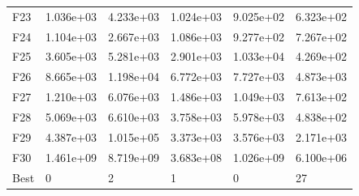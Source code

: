 \begin{tabular}{llllll}
F23  &  1.036e+03 &  4.233e+03 &  1.024e+03 &  9.025e+02 &  6.323e+02 \\
F24  &  1.104e+03 &  2.667e+03 &  1.086e+03 &  9.277e+02 &  7.267e+02 \\
F25  &  3.605e+03 &  5.281e+03 &  2.901e+03 &  1.033e+04 &  4.269e+02 \\
F26  &  8.665e+03 &  1.198e+04 &  6.772e+03 &  7.727e+03 &  4.873e+03 \\
F27  &  1.210e+03 &  6.076e+03 &  1.486e+03 &  1.049e+03 &  7.613e+02 \\
F28  &  5.069e+03 &  6.610e+03 &  3.758e+03 &  5.978e+03 &  4.838e+02 \\
F29  &  4.387e+03 &  1.015e+05 &  3.373e+03 &  3.576e+03 &  2.171e+03 \\
F30  &  1.461e+09 &  8.719e+09 &  3.683e+08 &  1.026e+09 &  6.100e+06 \\
Best &          0 &          2 &          1 &          0 &         27 \\
\bottomrule
\end{tabular}
